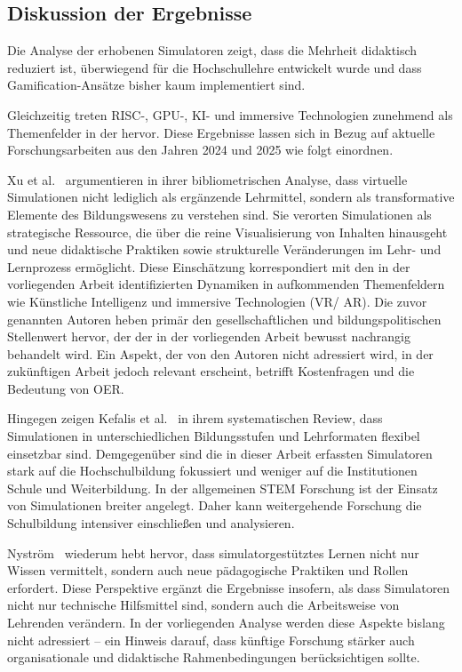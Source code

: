 \subsection{Diskussion der Ergebnisse}

Die Analyse der erhobenen Simulatoren zeigt, dass die Mehrheit didaktisch reduziert ist, überwiegend für die Hochschullehre entwickelt wurde und dass Gamification-Ansätze bisher kaum implementiert sind.

Gleichzeitig treten \acs{RISC}-, GPU-, \acs{KI}- und immersive Technologien zunehmend als Themenfelder in der hervor. Diese Ergebnisse lassen sich in Bezug auf aktuelle Forschungsarbeiten aus den Jahren 2024 und 2025 wie folgt einordnen.

Xu et al.~\cite{xu_present_2025} argumentieren in ihrer bibliometrischen Analyse, dass virtuelle Simulationen nicht lediglich als ergänzende Lehrmittel, sondern als transformative Elemente des Bildungswesens zu verstehen sind. Sie verorten Simulationen als strategische Ressource, die über die reine Visualisierung von Inhalten hinausgeht und neue didaktische Praktiken sowie strukturelle Veränderungen im Lehr- und Lernprozess  ermöglicht. Diese Einschätzung korrespondiert mit den in der vorliegenden Arbeit identifizierten Dynamiken in aufkommenden Themenfeldern wie Künstliche Intelligenz und immersive Technologien (\acs{VR}/ \acs{AR}). Die zuvor genannten Autoren heben primär den gesellschaftlichen und bildungspolitischen Stellenwert hervor, der der in der vorliegenden Arbeit bewusst nachrangig behandelt wird. Ein Aspekt, der von den Autoren nicht adressiert wird, in der zukünftigen Arbeit jedoch relevant erscheint, betrifft Kostenfragen und die Bedeutung von \ac{OER}. 

Hingegen zeigen Kefalis et al.~\cite{kefalis_digital_2025} in ihrem systematischen Review, dass Simulationen in unterschiedlichen Bildungsstufen und Lehrformaten flexibel einsetzbar sind. Demgegenüber sind die in dieser Arbeit erfassten Simulatoren stark auf die Hochschulbildung fokussiert und weniger auf die Institutionen Schule und Weiterbildung. In der allgemeinen \acs{STEM} Forschung ist der Einsatz von Simulationen breiter angelegt. Daher kann weitergehende Forschung die Schulbildung intensiver einschließen und analysieren.

Nyström~\cite{nystrom_teaching_2024} wiederum hebt hervor, dass simulatorgestütztes Lernen nicht nur Wissen vermittelt, sondern auch neue pädagogische Praktiken und Rollen erfordert. Diese Perspektive ergänzt die Ergebnisse insofern, als dass Simulatoren nicht nur technische Hilfsmittel sind, sondern auch die Arbeitsweise von Lehrenden verändern. In der vorliegenden Analyse werden diese Aspekte bislang nicht adressiert -- ein Hinweis darauf, dass künftige Forschung stärker auch organisationale und didaktische Rahmenbedingungen berücksichtigen sollte.

